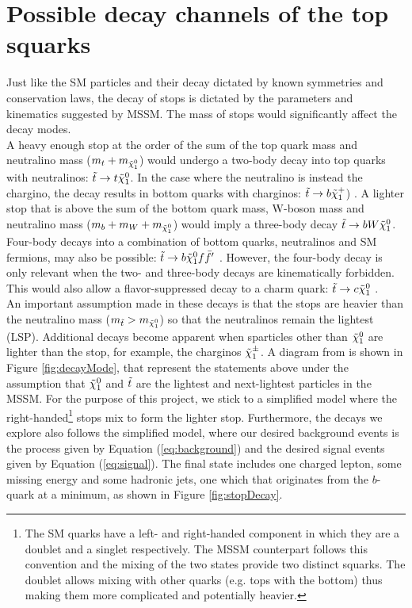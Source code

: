 \section{Possible decay channels of the top squarks} 
\label{sec:stopDecay}
Just like the SM particles and their decay dictated by known symmetries and conservation laws, the decay of stops is dictated by the parameters and kinematics suggested by MSSM. The mass of stops would significantly affect the decay modes. \\

A heavy enough stop at the order of the sum of the top quark mass and neutralino mass ($m_t+m_{\Tilde{\chi}_1^0}$) would undergo a two-body decay into top quarks with neutralinos: $\Tilde{t}\rightarrow t\Tilde{\chi}_1^0$. In the case where the neutralino is instead the chargino, the decay results in bottom quarks with charginos: $\Tilde{t}\rightarrow b\Tilde{\chi}_1^+$) \cite{boehm2000decays}. A lighter stop that is above the sum of the bottom quark mass, W-boson mass and neutralino mass ($m_b + m_W + m_{\Tilde{\chi}_1^0}$) would imply a three-body decay $\Tilde{t}\rightarrow b W \Tilde{\chi}_1^0$. Four-body decays into a combination of bottom quarks, neutralinos and SM fermions, may also be possible: $\Tilde{t}\rightarrow b\Tilde{\chi}_1^0 f \Bar{f}'$ \cite{boehm2000decays}. However, the four-body decay is only relevant when the two- and three-body decays are kinematically forbidden. This would also allow a flavor-suppressed decay to a charm quark: $\Tilde{t}\rightarrow c\Tilde{\chi}_1^0$ \cite{aad2014search}. \\

An important assumption made in these decays is that the stops are heavier than the neutralino mass ($m_{\Tilde{t}} > m_{\Tilde{\chi}_1^0} $) so that the neutralinos remain the lightest (LSP). Additional decays become apparent when sparticles other than $\Tilde{\chi}_1^0 $ are lighter than the stop, for example, the charginos $\Tilde{\chi}_1^{\pm}$. A diagram from \cite{aad2014search} is shown in Figure \ref{fig:decayMode}, that represent the statements above under the assumption that $ \Tilde{\chi}_1^0 $ and $\Tilde{t}$ are the lightest and next-lightest particles in the MSSM. For the purpose of this project, we stick to a simplified model where the right-handed\footnote{The SM quarks have a left- and right-handed component in which they are a doublet and a singlet respectively. The MSSM counterpart follows this convention and the mixing of the two states provide two distinct squarks. The doublet allows mixing with other quarks (e.g. tops with the bottom) thus making them more complicated and potentially heavier.} stops mix to form the lighter stop. Furthermore, the decays we explore also follows the simplified model, where our desired background events is the process given by Equation (\ref{eq:background}) and the desired signal events given by Equation (\ref{eq:signal}). The final state includes one charged lepton, some missing energy and some hadronic jets, one which that originates from the $b$-quark at a minimum, as shown in Figure \ref{fig:stopDecay}.\\


